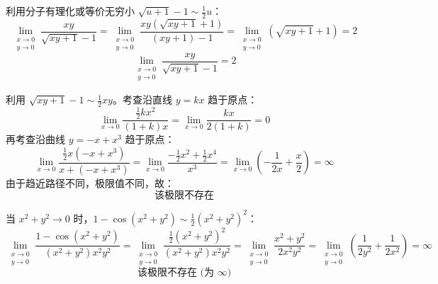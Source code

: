 \begin{solution}
    利用分子有理化或等价无穷小 $\sqrt{u+1}-1 \sim \frac{1}{2}u$：
    \begin{equation}
        \lim_{\substack{x \to 0 \\ y \to 0}} \frac{xy}{\sqrt{xy+1}-1} = \lim_{\substack{x \to 0 \\ y \to 0}} \frac{xy(\sqrt{xy+1}+1)}{(xy+1)-1} = \lim_{\substack{x \to 0 \\ y \to 0}} (\sqrt{xy+1}+1) = 2
    \end{equation}
    \begin{equation}
        \boxed{\lim_{\substack{x \to 0 \\ y \to 0}} \frac{xy}{\sqrt{xy+1}-1} = 2}
    \end{equation}

    利用 $\sqrt{xy+1}-1 \sim \frac{1}{2}xy$。考查沿直线 $y = kx$ 趋于原点：
    \begin{equation}
        \lim_{x \to 0} \frac{\frac{1}{2}kx^2}{(1+k)x} = \lim_{x \to 0} \frac{kx}{2(1+k)} = 0
    \end{equation}
    再考查沿曲线 $y = -x + x^3$ 趋于原点：
    \begin{equation}
        \lim_{x \to 0} \frac{\frac{1}{2}x(-x+x^3)}{x+(-x+x^3)} = \lim_{x \to 0} \frac{-\frac{1}{2}x^2 + \frac{1}{2}x^4}{x^3} = \lim_{x \to 0} \left( -\frac{1}{2x} + \frac{x}{2} \right) = \infty
    \end{equation}
    由于趋近路径不同，极限值不同，故：
    \begin{equation}
        \boxed{\text{该极限不存在}}
    \end{equation}

    当 $x^2 + y^2 \to 0$ 时，$1 - \cos(x^2+y^2) \sim \frac{1}{2}(x^2+y^2)^2$：
    \begin{equation}
        \lim_{\substack{x \to 0 \\ y \to 0}} \frac{1-\cos(x^2+y^2)}{(x^2+y^2)x^2y^2} = \lim_{\substack{x \to 0 \\ y \to 0}} \frac{\frac{1}{2}(x^2+y^2)^2}{(x^2+y^2)x^2y^2} = \lim_{\substack{x \to 0 \\ y \to 0}} \frac{x^2+y^2}{2x^2y^2} = \lim_{\substack{x \to 0 \\ y \to 0}} \left( \frac{1}{2y^2} + \frac{1}{2x^2} \right) = \infty
    \end{equation}
    \begin{equation}
        \boxed{\text{该极限不存在 (为 } \infty \text{)}}
    \end{equation}


\end{solution}
